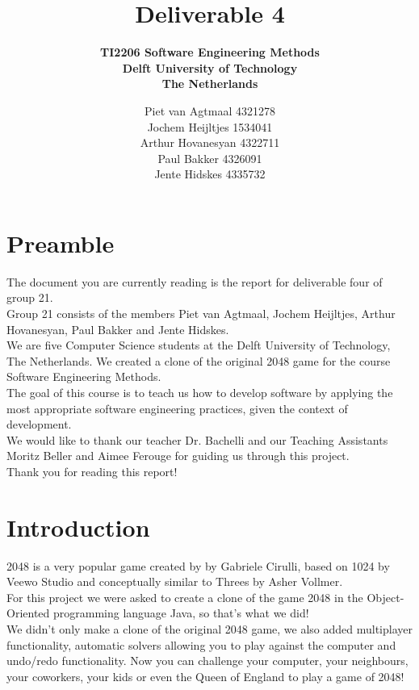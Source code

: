 \documentclass[a4paper,11pt,report]{scrartcl}
\title{\huge\textbf{Deliverable 4}}
\subtitle{\textbf{TI2206 Software Engineering Methods\\
Delft University of Technology\\
The Netherlands}}
\author{Piet van Agtmaal 4321278\\
	    Jochem Heijltjes 1534041\\
		Arthur Hovanesyan 4322711\\
		Paul Bakker 4326091\\
		Jente Hidskes 4335732
	   }
\begin{document}
\begin{titlepage}
\maketitle
\thispagestyle{empty} %
\end{titlepage}

\newpage\section{Preamble}

The document you are currently reading is the report for deliverable four of group 21.\\

Group 21 consists of the members 
Piet van Agtmaal, Jochem Heijltjes, Arthur Hovanesyan, Paul Bakker and Jente Hidskes.\\
We are five Computer Science students at the Delft University of Technology,
The Netherlands. We created a clone of the original 2048 game for the course
Software Engineering Methods.\\

The goal of this course is to teach us how to develop software by applying the most appropriate software engineering practices, given the context of development.\\

We would like to thank our teacher Dr. Bachelli and our Teaching Assistants Moritz Beller and Aimee Ferouge for guiding us through this project.\\

Thank you for reading this report!\\

\newpage\section{Introduction}

2048 is a very popular game created by by Gabriele Cirulli, based on 1024 by
Veewo Studio and conceptually similar to Threes by Asher Vollmer.\\
For this project we were asked to create a clone of the game 2048 in the Object-Oriented programming language Java, so that's what we did!\\

We didn't only make a clone of the original 2048 game, we also added
multiplayer functionality, automatic solvers allowing you to play against the computer and 
undo/redo functionality. 
Now you can challenge your computer, your neighbours, your
coworkers, your kids or even the Queen of England to play a game of 2048!\\
\end{document}
